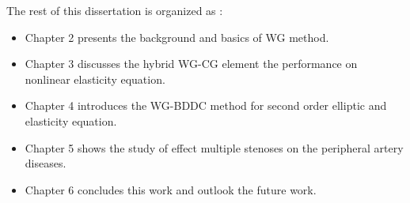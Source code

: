 The rest of this dissertation is organized as :

\begin{itemize}
	\item Chapter 2 presents the background and basics of WG method.
	\item Chapter 3 discusses the hybrid WG-CG element the performance on nonlinear elasticity equation.
	\item Chapter 4 introduces the WG-BDDC method for second order elliptic and elasticity equation.
	\item Chapter 5 shows the study of effect multiple stenoses on the peripheral artery diseases.
	\item Chapter 6 concludes this work and outlook the future work.
\end{itemize}
